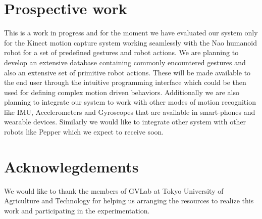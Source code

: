 \documentclass{llncs}
\begin{document}
\section{Prospective work}
	This is a work in progress and for the moment we have evaluated our system only for the Kinect motion capture system working seamlessly with the Nao humanoid robot for a set of predefined gestures and robot actions. We are planning to develop an extensive database containing commonly encountered gestures and also an extensive set of primitive robot actions. These will be made available to the end user through the intuitive programming interface which could be then used for defining complex motion driven behaviors. Additionally we are also planning to integrate our system to work with other modes of motion recognition like IMU, Accelerometers and Gyroscopes that are available in smart-phones and wearable devices. Similarly we would like to integrate other system with other robots like Pepper which we expect to receive soon.
\section{Acknowlegdements}
		We would like to thank the members of GVLab at Tokyo University of Agriculture and Technology for helping us arranging the resources to realize this work and participating in the experimentation.


\end{document}
